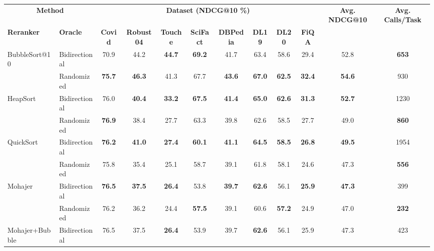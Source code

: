 \documentclass{llmxive}
\providecommand{\arraystretch}{1.00}
\begin{document}
\begin{table}[!t]
\centering
\footnotesize
\setlength{\tabcolsep}{3pt}
\renewcommand{\arraystretch}{1.12}
\begin{adjustbox}{max width=\textwidth}
\begin{tabular}{llcccccccccc}
\toprule
\multicolumn{2}{c}{\textbf{Method}} &
\multicolumn{8}{c}{\textbf{Dataset (NDCG@10 \%)}} &
\textbf{Avg. NDCG@10} & \textbf{Avg. Calls/Task} \\
\cmidrule(lr){1-2}\cmidrule(lr){3-10}\cmidrule(lr){11-12}
\textbf{Reranker} & \textbf{Oracle} &
\textbf{Covid} & \textbf{Robust04} & \textbf{Touche} & \textbf{SciFact} &
\textbf{DBPedia} & \textbf{DL19} & \textbf{DL20} & \textbf{FiQA} & & \\
\midrule
\multirow{2}{*}{BubbleSort@10} & Bidirectional
& 70.9 & 44.2 & \textbf{44.7} & \textbf{69.2} & 41.7 & 63.4 & 58.6 & 29.4 & 52.8 & \textbf{653} \\
& Randomized
& \textbf{75.7} & \textbf{46.3} & 41.3 & 67.7 & \textbf{43.6} & \textbf{67.0} & \textbf{62.5} & \textbf{32.4} & \textbf{54.6} & 930 \\
\midrule
\multirow{2}{*}{HeapSort} & Bidirectional
& 76.0 & \textbf{40.4} & \textbf{33.2} & \textbf{67.5} & \textbf{41.4} & \textbf{65.0} & \textbf{62.6} & \textbf{31.3} & \textbf{52.7} & 1230 \\
& Randomized
& \textbf{76.9} & 38.4 & 27.7 & 63.3 & 39.8 & 62.6 & 58.5 & 27.7 & 49.0 & \textbf{860} \\
\midrule
\multirow{2}{*}{QuickSort} & Bidirectional
& \textbf{76.2} & \textbf{41.0} & \textbf{27.4} & \textbf{60.1} & \textbf{41.1} & \textbf{64.5} & \textbf{58.5} & \textbf{26.8} & \textbf{49.5} & 1954 \\
& Randomized
& 75.8 & 35.4 & 25.1 & 58.7 & 39.1 & 61.8 & 58.1 & 24.6 & 47.3 & \textbf{556} \\
\midrule
\multirow{2}{*}{Mohajer} & Bidirectional
& \textbf{76.5} & \textbf{37.5} & \textbf{26.4} & 53.8 & \textbf{39.7} & \textbf{62.6} & 56.1 & \textbf{25.9} & \textbf{47.3} & 399 \\
& Randomized
& 76.2 & 36.2 & 24.4 & \textbf{57.5} & 39.1 & 60.6 & \textbf{57.2} & 24.9 & 47.0 & \textbf{232} \\
\midrule
\multirow{2}{*}{Mohajer+Bubble} & Bidirectional
& 76.5 & 37.5 & \textbf{26.4} & 53.9 & 39.7 & \textbf{62.6} & 56.1 & 25.9 & 47.3 & 423 \\

\end{tabular}
\end{adjustbox}
\end{table}
\end{document}
